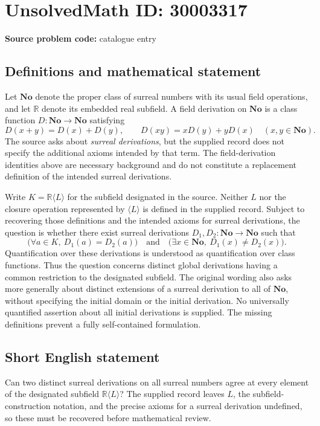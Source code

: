 \documentclass[11pt]{article}
\newcommand{\R}{\mathbb{R}}
\begin{document}
\section*{UnsolvedMath ID: 30003317}
\textbf{Source problem code:} catalogue entry
\subsection{Definitions and mathematical statement}
Let \(\mathbf{No}\) denote the proper class of surreal numbers with its usual field operations, and let \(\R\) denote its embedded real subfield. A field derivation on \(\mathbf{No}\) is a class function \(D:\mathbf{No}\to\mathbf{No}\) satisfying
\[
D(x+y)=D(x)+D(y),\qquad D(xy)=xD(y)+yD(x)
\quad(x,y\in\mathbf{No}).
\]
The source asks about \emph{surreal derivations}, but the supplied record does not specify the additional axioms intended by that term. The field-derivation identities above are necessary background and do not constitute a replacement definition of the intended surreal derivations.

Write \(K=\R\langle L\rangle\) for the subfield designated in the source. Neither \(L\) nor the closure operation represented by \(\langle L\rangle\) is defined in the supplied record. Subject to recovering those definitions and the intended axioms for surreal derivations, the question is whether there exist surreal derivations \(D_1,D_2:\mathbf{No}\to\mathbf{No}\) such that
\[
\bigl(\forall a\in K,\ D_1(a)=D_2(a)\bigr)
\quad\text{and}\quad
\bigl(\exists x\in\mathbf{No},\ D_1(x)\ne D_2(x)\bigr).
\]
Quantification over these derivations is understood as quantification over class functions. Thus the question concerns distinct global derivations having a common restriction to the designated subfield. The original wording also asks more generally about distinct extensions of a surreal derivation to all of \(\mathbf{No}\), without specifying the initial domain or the initial derivation. No universally quantified assertion about all initial derivations is supplied. The missing definitions prevent a fully self-contained formulation.
\subsection{Short English statement}
Can two distinct surreal derivations on all surreal numbers agree at every element of the designated subfield \(\R\langle L\rangle\)? The supplied record leaves \(L\), the subfield-construction notation, and the precise axioms for a surreal derivation undefined, so these must be recovered before mathematical review.
\end{document}
